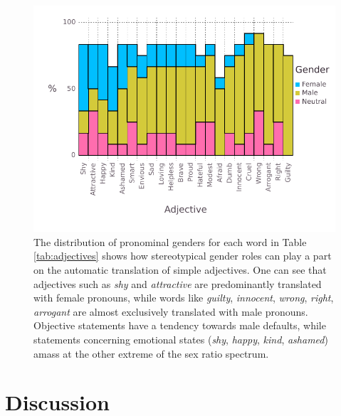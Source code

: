 \documentclass{article}
\begin{document}
\begin{figure}[H]
	\centering
	\includegraphics[width=\linewidth]{pictures/barplot-adjectives}
	\caption{The distribution of pronominal genders for each word in Table \ref{tab:adjectives} shows how stereotypical gender roles can play a part on the automatic translation of simple adjectives. One can see that adjectives such as \emph{shy} and \emph{attractive} are predominantly translated with female pronouns, while words like \emph{guilty}, \emph{innocent}, \emph{wrong}, \emph{right}, \emph{arrogant} are almost exclusively translated with male pronouns. Objective statements have a tendency towards male defaults, while statements concerning emotional states (\emph{shy}, \emph{happy}, \emph{kind}, \emph{ashamed}) amass at the other extreme of the sex ratio spectrum.}
	\label{fig:barplot-adjectives}
\end{figure}

\section{Discussion}
\end{document}
